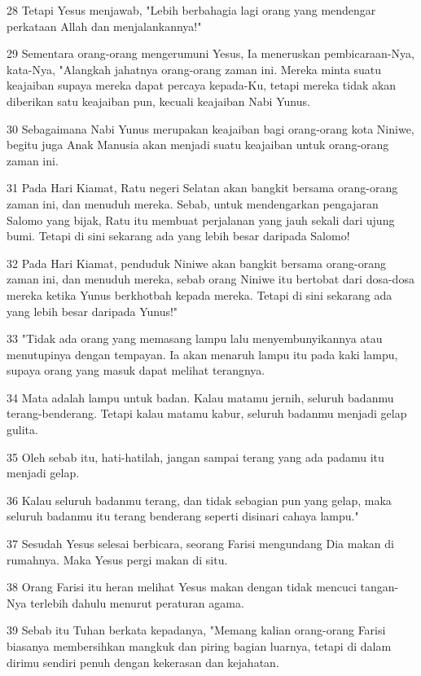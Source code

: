 \par 28 Tetapi Yesus menjawab, "Lebih berbahagia lagi orang yang mendengar perkataan Allah dan menjalankannya!"
\par 29 Sementara orang-orang mengerumuni Yesus, Ia meneruskan pembicaraan-Nya, kata-Nya, "Alangkah jahatnya orang-orang zaman ini. Mereka minta suatu keajaiban supaya mereka dapat percaya kepada-Ku, tetapi mereka tidak akan diberikan satu keajaiban pun, kecuali keajaiban Nabi Yunus.
\par 30 Sebagaimana Nabi Yunus merupakan keajaiban bagi orang-orang kota Niniwe, begitu juga Anak Manusia akan menjadi suatu keajaiban untuk orang-orang zaman ini.
\par 31 Pada Hari Kiamat, Ratu negeri Selatan akan bangkit bersama orang-orang zaman ini, dan menuduh mereka. Sebab, untuk mendengarkan pengajaran Salomo yang bijak, Ratu itu membuat perjalanan yang jauh sekali dari ujung bumi. Tetapi di sini sekarang ada yang lebih besar daripada Salomo!
\par 32 Pada Hari Kiamat, penduduk Niniwe akan bangkit bersama orang-orang zaman ini, dan menuduh mereka, sebab orang Niniwe itu bertobat dari dosa-dosa mereka ketika Yunus berkhotbah kepada mereka. Tetapi di sini sekarang ada yang lebih besar daripada Yunus!"
\par 33 "Tidak ada orang yang memasang lampu lalu menyembunyikannya atau menutupinya dengan tempayan. Ia akan menaruh lampu itu pada kaki lampu, supaya orang yang masuk dapat melihat terangnya.
\par 34 Mata adalah lampu untuk badan. Kalau matamu jernih, seluruh badanmu terang-benderang. Tetapi kalau matamu kabur, seluruh badanmu menjadi gelap gulita.
\par 35 Oleh sebab itu, hati-hatilah, jangan sampai terang yang ada padamu itu menjadi gelap.
\par 36 Kalau seluruh badanmu terang, dan tidak sebagian pun yang gelap, maka seluruh badanmu itu terang benderang seperti disinari cahaya lampu."
\par 37 Sesudah Yesus selesai berbicara, seorang Farisi mengundang Dia makan di rumahnya. Maka Yesus pergi makan di situ.
\par 38 Orang Farisi itu heran melihat Yesus makan dengan tidak mencuci tangan-Nya terlebih dahulu menurut peraturan agama.
\par 39 Sebab itu Tuhan berkata kepadanya, "Memang kalian orang-orang Farisi biasanya membersihkan mangkuk dan piring bagian luarnya, tetapi di dalam dirimu sendiri penuh dengan kekerasan dan kejahatan.
